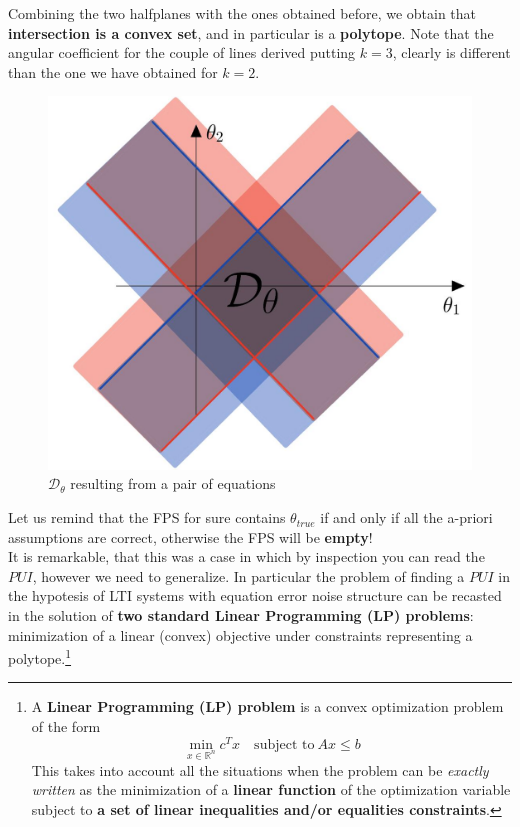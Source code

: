 \noindent
Combining the two halfplanes with the ones obtained before, we obtain that \textbf{intersection is a convex set}, and in particular is a \textbf{polytope}. Note that the angular coefficient for the couple of lines derived putting $k=3$, clearly is different than the one we have obtained for $k=2$.

\begin{figure}[h]
    \centering
    \includegraphics[scale=0.2]{img/polytope1.jpeg}
    \caption{$\mathcal{D}_\theta$ resulting from a pair of equations}
\end{figure}

{\color{blue}
\noindent
Let us remind that the FPS for sure contains $\theta_{true}$
if and only if all the a-priori assumptions are correct, otherwise the FPS will be \textbf{empty}!}\\
It is remarkable, that this was a case in which by inspection you can read the $PUI$, however we need to generalize. In particular the problem of finding a $PUI$ in the hypotesis of LTI systems with equation error noise structure can be recasted in the solution of \textbf{two standard Linear Programming (LP) problems}: minimization of a linear (convex) objective under constraints representing a polytope.\footnote{
    \noindent
    A \textbf{Linear Programming (LP) problem} is a convex optimization problem of the form
    \begin{equation*}
        \min_{x\in\mathbb{R}^n} {c^T{x}} \quad \text{subject to} \ Ax \le b
    \end{equation*}
    This takes into account all the situations when the problem can be \textit{exactly written} as the minimization of a \textbf{linear function} of the optimization variable subject to \textbf{a set of linear inequalities and/or equalities constraints}.
}

